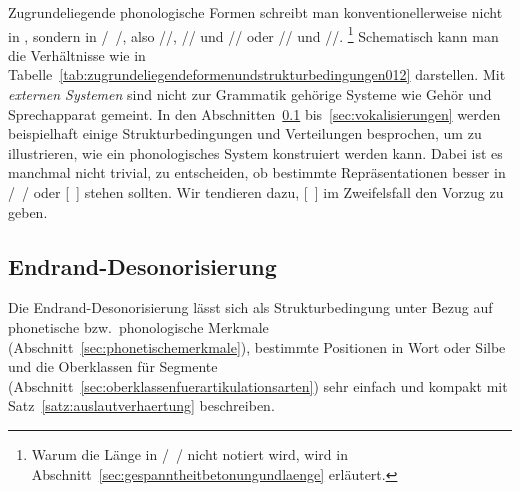 \begin{table}[!htbp]
  \caption{Lexikon, Phonologie und Phonetik}
  \label{tab:zugrundeliegendeformenundstrukturbedingungen012}
\end{table}

Zugrundeliegende phonologische Formen schreibt man konventionellerweise nicht in \textipa{[~]}, sondern in /~/, also \zB //, // und // oder // und \mbox{//}.%
\footnote{Warum die Länge in /~/ nicht notiert wird, wird in Abschnitt~\ref{sec:gespanntheitbetonungundlaenge} erläutert.}
Schematisch kann man die Verhältnisse wie in Tabelle~\ref{tab:zugrundeliegendeformenundstrukturbedingungen012} darstellen.
Mit \textit{externen Systemen} sind nicht zur Grammatik gehörige Systeme wie Gehör und Sprechapparat gemeint.
In den Abschnitten~\ref{sec:endranddesonorisierung} bis~\ref{sec:vokalisierungen} werden beispielhaft einige Strukturbedingungen und Verteilungen besprochen, um zu illustrieren, wie ein phonologisches System konstruiert werden kann.
Dabei ist es manchmal nicht trivial, zu entscheiden, ob bestimmte Repräsentationen besser in /~/ oder [~] stehen sollten.
Wir tendieren dazu, [~] im Zweifelsfall den Vorzug zu geben.

\subsection{Endrand-Desonorisierung}
\label{sec:endranddesonorisierung}


Die Endrand-Desonorisierung lässt sich als Strukturbedingung unter Bezug auf phonetische bzw.\ phonologische Merkmale (Abschnitt~\ref{sec:phonetischemerkmale}), bestimmte Positionen in Wort oder Silbe und die Oberklassen für Segmente (Abschnitt~\ref{sec:oberklassenfuerartikulationsarten}) sehr einfach und kompakt mit Satz~\ref{satz:auslautverhaertung} beschreiben.

